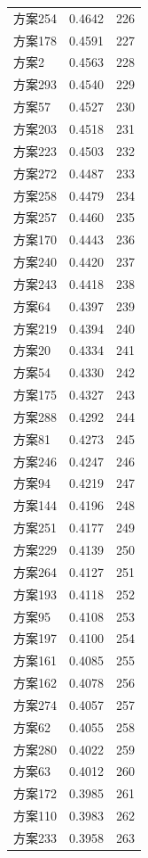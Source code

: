 \documentclass[12pt,a4paper]{article}
\begin{document}
\begin{table}[H]
\begin{tabular}{lcc}
    方案254 & 0.4642 & 226 \\
    方案178 & 0.4591 & 227 \\
    方案2 & 0.4563 & 228 \\
    方案293 & 0.4540 & 229 \\
    方案57 & 0.4527 & 230 \\
    方案203 & 0.4518 & 231 \\
    方案223 & 0.4503 & 232 \\
    方案272 & 0.4487 & 233 \\
    方案258 & 0.4479 & 234 \\
    方案257 & 0.4460 & 235 \\
    方案170 & 0.4443 & 236 \\
    方案240 & 0.4420 & 237 \\
    方案243 & 0.4418 & 238 \\
    方案64 & 0.4397 & 239 \\
    方案219 & 0.4394 & 240 \\
    方案20 & 0.4334 & 241 \\
    方案54 & 0.4330 & 242 \\
    方案175 & 0.4327 & 243 \\
    方案288 & 0.4292 & 244 \\
    方案81 & 0.4273 & 245 \\
    方案246 & 0.4247 & 246 \\
    方案94 & 0.4219 & 247 \\
    方案144 & 0.4196 & 248 \\
    方案251 & 0.4177 & 249 \\
    方案229 & 0.4139 & 250 \\
    方案264 & 0.4127 & 251 \\
    方案193 & 0.4118 & 252 \\
    方案95 & 0.4108 & 253 \\
    方案197 & 0.4100 & 254 \\
    方案161 & 0.4085 & 255 \\
    方案162 & 0.4078 & 256 \\
    方案274 & 0.4057 & 257 \\
    方案62 & 0.4055 & 258 \\
    方案280 & 0.4022 & 259 \\
    方案63 & 0.4012 & 260 \\
    方案172 & 0.3985 & 261 \\
    方案110 & 0.3983 & 262 \\
    方案233 & 0.3958 & 263 \\

\end{tabular}
\end{table}
\end{document}
